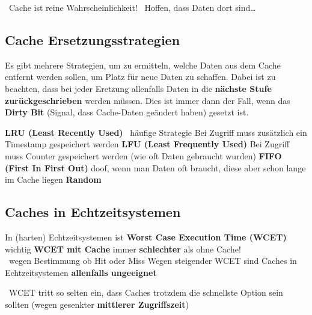 \vspace{0.1cm}

\textrightarrow\ Cache ist reine Wahrscheinlichkeit! \textrightarrow\ Hoffen, dass Daten dort sind\ldots


\subsection{Cache Ersetzungsstrategien}

Es gibt mehrere Strategien, um zu ermitteln, welche Daten aus dem Cache entfernt werden sollen, um Platz für neue Daten zu schaffen.
Dabei ist zu beachten, dass bei jeder Eretzung allenfalls Daten in die \textbf{nächste Stufe zurückgeschrieben} werden müssen.
Dies ist immer dann der Fall, wenn das \textbf{Dirty Bit} (Signal, dass Cache-Daten geändert haben) gesetzt ist.

\vspace{0.1cm}

\begin{outline}
    \1 \textbf{LRU (Least Recently Used)} \textrightarrow\ häufige Strategie
        \2 Bei Zugriff muss zusätzlich ein Timestamp gespeichert werden
    \1 \textbf{LFU (Least Frequently Used)}
        \2 Bei Zugriff muss Counter gespeichert werden (wie oft Daten gebraucht wurden)
    \1 \textbf{FIFO (First In First Out)}
        \2 doof, wenn man Daten oft braucht, diese aber schon lange im Cache liegen
    \1 \textbf{Random}
\end{outline}


\subsection{Caches in Echtzeitsystemen}

\begin{outline}
    \1 In (harten) Echtzeitsystemen ist \textbf{Worst Case Execution Time (WCET)} wichtig
        \2 \textbf{WCET mit Cache} immer \textbf{schlechter} als ohne Cache!\\
        \textrightarrow\ wegen Bestimmung ob Hit oder Miss
    \1 Wegen steigender WCET sind Caches in Echtzeitsystemen \textbf{allenfalls ungeeignet}
\end{outline}

\vspace{0.1cm}

\textrightarrow\ WCET tritt so selten ein, dass Caches trotzdem die schnellste Option sein sollten (wegen gesenkter \textbf{mittlerer Zugriffszeit})


